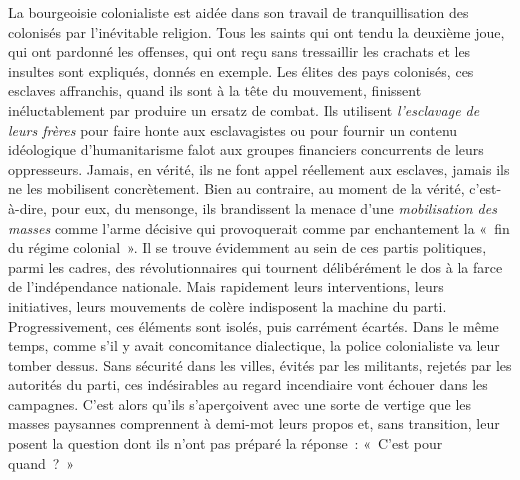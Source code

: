 \documentclass[french,twoside]{book} %
\begin{document}
\bigbreak
\noindent La bourgeoisie colonialiste est aidée dans son travail de tranquillisation des colonisés par l’inévitable religion. Tous les saints qui ont tendu la deuxième joue, qui ont pardonné les offenses, qui ont reçu sans tressaillir les crachats et les insultes sont expliqués, donnés en exemple. Les élites des pays colonisés, ces esclaves affranchis, quand ils sont à la tête du mouvement, finissent inéluctablement par produire un ersatz de combat. Ils utilisent \emph{l’esclavage de leurs frères} pour faire honte aux esclavagistes ou pour fournir un contenu idéologique d’humanitarisme falot aux groupes financiers concurrents de leurs oppresseurs. Jamais, en vérité, ils ne font appel réellement aux esclaves, jamais ils ne les mobilisent concrètement. Bien au contraire, au moment de la vérité, c’est-à-dire, pour eux, du mensonge, ils brandissent la menace d’une \emph{mobilisation des}   \emph{masses} comme l’arme décisive qui provoquerait comme par enchantement la « fin du régime colonial ». Il se trouve évidemment au sein de ces partis politiques, parmi les cadres, des révolutionnaires qui tournent délibérément le dos à la farce de l’indépendance nationale. Mais rapidement leurs interventions, leurs initiatives, leurs mouvements de colère indisposent la machine du parti. Progressivement, ces éléments sont isolés, puis carrément écartés. Dans le même temps, comme s’il y avait concomitance dialectique, la police colonialiste va leur tomber dessus. Sans sécurité dans les villes, évités par les militants, rejetés par les autorités du parti, ces indésirables au regard incendiaire vont échouer dans les campagnes. C’est alors qu’ils s’aperçoivent avec une sorte de vertige que les masses paysannes comprennent à demi-mot leurs propos et, sans transition, leur posent la question dont ils n’ont pas préparé la réponse : « C’est pour quand ? »\par
\bigbreak
\end{document}
